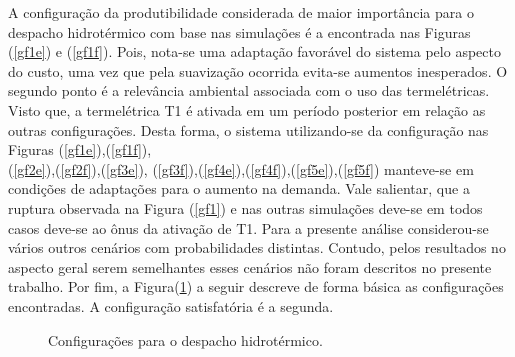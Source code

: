 A configura\c c\~ao da
produtibilidade considerada de maior import\^ancia para o despacho hidrot\'ermico com base nas simula\c c\~oes \'e a
encontrada nas Figuras
(\ref{gf1e}) e (\ref{gf1f}). Pois, nota-se uma adapta\c c\~ao favor\'avel do sistema pelo
aspecto do custo, uma vez que pela suaviza\c c\~ao ocorrida evita-se aumentos inesperados. O segundo ponto  \'e a
relev\^ancia ambiental associada com o uso das termel\'etricas. Visto que, a termel\'etrica T1 \'e ativada em um
per\'iodo posterior em rela\c c\~ao as outras configura\c c\~oes. Desta forma, o sistema utilizando-se da configura\c
c\~ao nas Figuras (\ref{gf1e}),(\ref{gf1f}),\\(\ref{gf2e}),(\ref{gf2f}),(\ref{gf3e}),
(\ref{gf3f}),(\ref{gf4e}),(\ref{gf4f}),(\ref{gf5e}),(\ref{gf5f})
manteve-se em condi\c c\~oes de adapta\c c\~oes para o aumento na demanda. Vale salientar,
que a ruptura observada na Figura (\ref{gf1}) e nas outras simula\c c\~oes deve-se em todos casos deve-se ao \^onus da ativa\c c\~ao de T1.
Para a presente
an\'alise considerou-se v\'arios outros cen\'arios com probabilidades distintas. Contudo, pelos resultados no aspecto
geral serem semelhantes esses cen\'arios n\~ao foram descritos no presente trabalho. Por fim, a Figura(\ref{despacho}) a seguir descreve
de forma b\'asica as configura\c c\~oes encontradas. A configura\c c\~ao satisfat\'oria \'e a segunda.
\pagebreak
\begin{figure}[!ht]
    \centering
    
    \caption{Configura\c c\~oes para o despacho hidrot\'ermico.}
	\label{despacho}
\end{figure}

